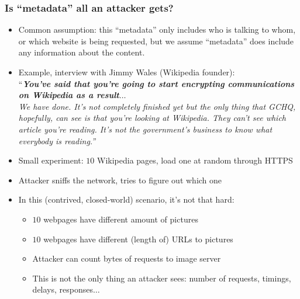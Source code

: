 \begin{frame}
  \frametitle{Is ``metadata'' all an attacker gets?}
  \begin{itemize}
    \item Common assumption: this ``metadata'' only includes who is talking to
      whom, or which website is being requested, but we assume ``metadata'' does
      include any information about the content.
    \item Example, interview with Jimmy Wales (Wikipedia founder):\\[2mm]
      ``\emph{\textbf{You've said that you're going to start encrypting communications on Wikipedia as a result$\dots$}\\[3mm]
      We have done. It's not completely finished yet but the only thing that GCHQ, hopefully, 
      can see is that you're looking at Wikipedia. They can't see which article you're reading. 
    It's not the government's business to know what everybody is reading.''}
  \item<2-> Small experiment: $10$ Wikipedia pages, load one at random through HTTPS
  \item<2-> Attacker sniffs the network, tries to figure out which one
  \item<5-> In this (contrived, closed-world) scenario, it's not that hard: 
    \begin{itemize}
      \item $10$ webpages have different amount of pictures
      \item $10$ webpages have different (length of) URLs to pictures
      \item Attacker can count bytes of requests to image server
      \item<6-> This is not the only thing an attacker sees: number of requests,
        timings, delays, responses$\dots$
    \end{itemize}
  \end{itemize}

\end{frame}


